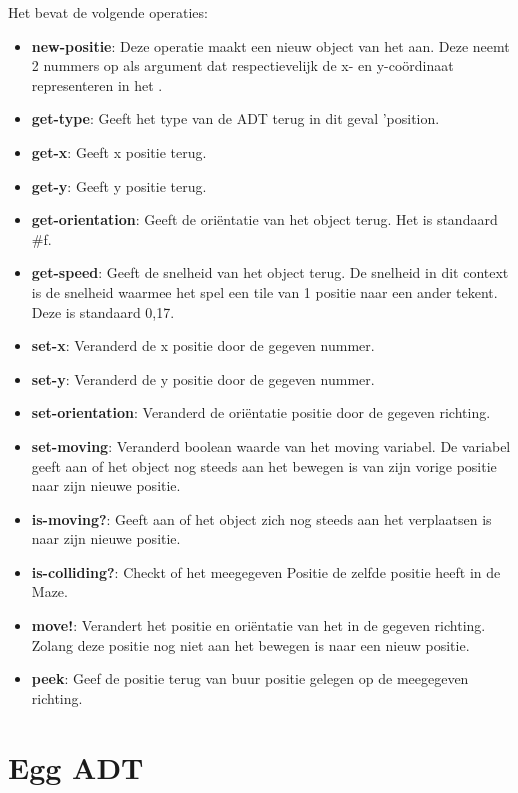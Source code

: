 Het \texttt{} bevat de volgende operaties:

\begin{itemize}
	\item \textbf{new-positie}: Deze operatie maakt een nieuw object van het \texttt{} aan. 
		Deze neemt 2 nummers op als argument
		dat respectievelijk de x- en y-co\"ordinaat representeren in het \texttt{}.
	\item \textbf{get-type}: Geeft het type van de ADT terug in dit geval 'position.
	\item \textbf{get-x}: Geeft x positie terug.
	\item \textbf{get-y}: Geeft y positie terug.
	\item \textbf{get-orientation}: Geeft de oriëntatie van het object terug.
		Het is standaard \#f.
	\item \textbf{get-speed}: Geeft de snelheid van het object terug.
		De snelheid in dit context is 
		de snelheid waarmee het spel een tile van 1 positie naar een ander tekent.
		Deze is standaard 0,17.
	\item \textbf{set-x}: Veranderd de x positie door de gegeven nummer.
	\item \textbf{set-y}: Veranderd de y positie door de gegeven nummer.
	\item \textbf{set-orientation}: Veranderd de oriëntatie positie door de gegeven richting.
	\item \textbf{set-moving}: Veranderd boolean waarde van het moving variabel.
		De variabel geeft aan of het object nog steeds aan het bewegen is van zijn vorige positie naar zijn nieuwe positie.
	\item \textbf{is-moving?}: Geeft aan of het object zich nog steeds aan het verplaatsen is naar zijn nieuwe positie.
	\item \textbf{is-colliding?}: Checkt of het meegegeven Positie de zelfde positie heeft in de Maze.
	\item \textbf{move!}: Verandert het positie en oriëntatie van het \texttt{} in de gegeven richting.
		Zolang deze positie nog niet aan het bewegen is naar een nieuw positie.
	\item \textbf{peek}: Geef de positie terug van buur positie gelegen op de meegegeven richting.
\end{itemize}

\section{Egg ADT}
\label{section:egg}

